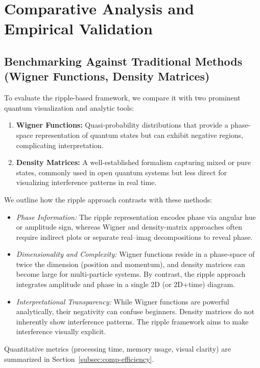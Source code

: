 \documentclass[11pt]{article}
\begin{document}
\section{Comparative Analysis and Empirical Validation}
\label{sec:analysis-validation}

\subsection{Benchmarking Against Traditional Methods (Wigner Functions, Density Matrices)}
\label{subsec:benchmarking}
To evaluate the ripple-based framework, we compare it with two prominent 
quantum visualization and analytic tools:
\begin{enumerate}
  \item \textbf{Wigner Functions:} 
    Quasi-probability distributions that provide a phase-space 
    representation of quantum states but can exhibit negative 
    regions, complicating interpretation.
  \item \textbf{Density Matrices:} 
    A well-established formalism capturing mixed or pure states, 
    commonly used in open quantum systems but less direct for 
    visualizing interference patterns in real time.
\end{enumerate}
We outline how the ripple approach contrasts with these methods:
\begin{itemize}
  \item \textit{Phase Information:} 
    The ripple representation encodes phase via angular 
    hue or amplitude sign, whereas Wigner and density-matrix 
    approaches often require indirect plots or separate real--imag 
    decompositions to reveal phase.
  \item \textit{Dimensionality and Complexity:} 
    Wigner functions reside in a phase-space of twice the dimension 
    (position and momentum), and density matrices can become large 
    for multi-particle systems. By contrast, the ripple approach 
    integrates amplitude and phase in a single 2D (or 2D+time) diagram.
  \item \textit{Interpretational Transparency:} 
    While Wigner functions are powerful analytically, their 
    negativity can confuse beginners. Density matrices do not 
    inherently show interference patterns. The ripple framework 
    aims to make interference visually explicit.
\end{itemize}
Quantitative metrics (processing time, memory usage, visual clarity) 
are summarized in Section~\ref{subsec:comp-efficiency}.
\end{document}
